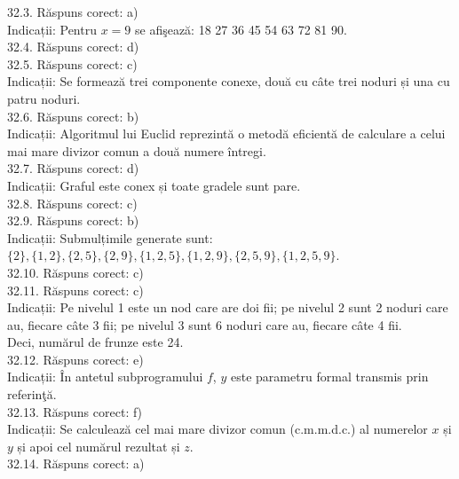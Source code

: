32.3. Răspuns corect: a)\\
Indicații: Pentru $x=9$ se afişează: 18 27 36 45 54 63 72 81 90.\\

32.4. Răspuns corect: d)\\

32.5. Răspuns corect: c)\\
Indicații: Se formează trei componente conexe, două cu câte trei noduri și una cu patru noduri.\\

32.6. Răspuns corect: b)\\
Indicații: Algoritmul lui Euclid reprezintă o metodă eficientă de calculare a celui mai mare divizor comun a două numere întregi.\\

32.7. Răspuns corect: d)\\
Indicații: Graful este conex și toate gradele sunt pare.\\

32.8. Răspuns corect: c)\\

32.9. Răspuns corect: b)\\
Indicații: Submulțimile generate sunt:\\ $\{2\},\{1,2\},\{2,5\},\{2,9\},\{1,2,5\},\{1,2,9\},\{2,5,9\},\{1,2,5,9\}$.\\

32.10. Răspuns corect: c)\\

32.11. Răspuns corect: c)\\
Indicații: Pe nivelul 1 este un nod care are doi fii; pe nivelul 2 sunt 2 noduri care au, fiecare câte 3 fii; pe nivelul 3 sunt 6 noduri care au, fiecare câte 4 fii.\\ Deci, numărul de frunze este 24.\\

32.12. Răspuns corect: e)\\
Indicații: În antetul subprogramului $f$, $y$ este parametru formal transmis prin referinţă.\\

32.13. Răspuns corect: f)\\
Indicații: Se calculează cel mai mare divizor comun (c.m.m.d.c.) al numerelor $x$ și $y$ și apoi cel numărul rezultat și $z$.\\

32.14. Răspuns corect: a)\\

